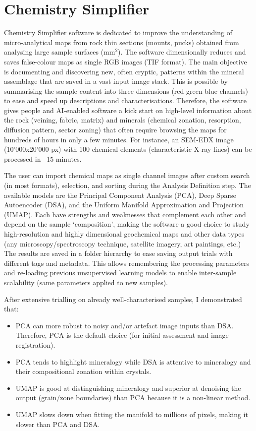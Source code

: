 \section{Chemistry Simplifier}
\label{chap:repo2}
	
	Chemistry Simplifier software is dedicated to improve the understanding of micro-analytical maps from rock thin sections (mounts, pucks) obtained from analysing large sample surfaces (mm$^{2}$). The software dimensionally reduces and saves false-colour maps as single RGB images (TIF format). The main objective is documenting and discovering new, often cryptic, patterns within the mineral assemblage that are saved in a vast input image stack. This is possible by summarising the sample content into three dimensions (red-green-blue channels) to ease and speed up descriptions and characterisations. Therefore, the software gives people and AI-enabled software a kick start on high-level information about the rock (veining, fabric, matrix) and minerals (chemical zonation, resorption, diffusion pattern, sector zoning) that often require browsing the maps for hundreds of hours in only a few minutes. For instance, an SEM-EDX image (10'000x20'000 px) with 100 chemical elements (characteristic X-ray lines) can be processed in ~15 minutes. 
	
	The user can import chemical maps as single channel images after custom search (in most formats), selection, and sorting during the Analysis Definition step. The available models are the Principal Component Analysis (PCA), Deep Sparse Autoencoder (DSA), and the Uniform Manifold Approximation and Projection (UMAP). Each have strengths and weaknesses that complement each other and depend on the sample `composition', making the software a good choice to study high-resolution and highly dimensional geochemical maps and other data types (any microscopy/spectroscopy technique, satellite imagery, art paintings, etc.) The results are saved in a folder hierarchy to ease saving output trials with different tags and metadata. This allows remembering the processing parameters and re-loading previous unsupervised learning models to enable inter-sample scalability (same parameters applied to new samples). 	
	
	After extensive trialling on already well-characterised samples, I demonstrated that:
	
	\begin{itemize}		
		\item PCA can more robust to noisy and/or artefact image inputs than DSA. Therefore, PCA is the default choice (for initial assessment and image registration).
		\item PCA tends to highlight mineralogy while DSA is attentive to mineralogy and their compositional zonation within crystals.
		\item UMAP is good at distinguishing mineralogy and superior at denoising the output (grain/zone boundaries) than PCA because it is a non-linear method.
		\item UMAP slows down when fitting the manifold to millions of pixels, making it slower than PCA and DSA.
	\end{itemize}
	
